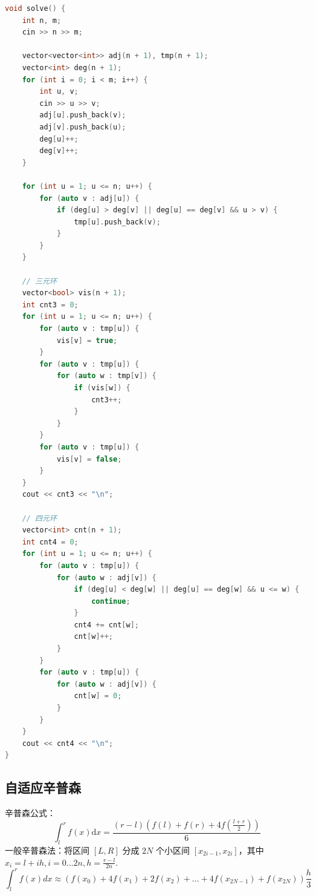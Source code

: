 \begin{lstlisting}[language = C++]
void solve() {
    int n, m;
    cin >> n >> m;

    vector<vector<int>> adj(n + 1), tmp(n + 1);
    vector<int> deg(n + 1);
    for (int i = 0; i < m; i++) {
        int u, v;
        cin >> u >> v;
        adj[u].push_back(v);
        adj[v].push_back(u);
        deg[u]++;
        deg[v]++;
    }

    for (int u = 1; u <= n; u++) {
        for (auto v : adj[u]) {
            if (deg[u] > deg[v] || deg[u] == deg[v] && u > v) {
                tmp[u].push_back(v);
            }
        }
    }

    // 三元环
    vector<bool> vis(n + 1);
    int cnt3 = 0;
    for (int u = 1; u <= n; u++) {
        for (auto v : tmp[u]) {
            vis[v] = true;
        }
        for (auto v : tmp[u]) {
            for (auto w : tmp[v]) {
                if (vis[w]) {
                    cnt3++;
                }
            }
        }
        for (auto v : tmp[u]) {
            vis[v] = false;
        }
    }
    cout << cnt3 << "\n";

    // 四元环
    vector<int> cnt(n + 1);
    int cnt4 = 0;
    for (int u = 1; u <= n; u++) {
        for (auto v : tmp[u]) {
            for (auto w : adj[v]) {
                if (deg[u] < deg[w] || deg[u] == deg[w] && u <= w) {
                    continue;
                }
                cnt4 += cnt[w];
                cnt[w]++;
            }
        }
        for (auto v : tmp[u]) {
            for (auto w : adj[v]) {
                cnt[w] = 0;
            }
        }
    }
    cout << cnt4 << "\n";
}
\end{lstlisting}

\subsection{自适应辛普森}

辛普森公式：
\[
    \int_l^r f(x) \mathrm{d} x=\frac{(r-l)\left(f(l)+f(r)+4 f\left(\frac{l+r}{2}\right)\right)}{6}
\]
一般辛普森法：将区间 $[L, R]$ 分成 $2N$ 个小区间 $[x_{2i-1}, x_{2i}]$，其中 $x_i=l+i h, i=0 \ldots 2 n, h=\frac{r-l}{2 n}$.
\[
    \int_l^r f(x) d x \approx\left(f\left(x_0\right)+4 f\left(x_1\right)+2 f\left(x_2\right)+\ldots+4 f\left(x_{2 N-1}\right)+f\left(x_{2 N}\right)\right) \frac{h}{3}
\]

